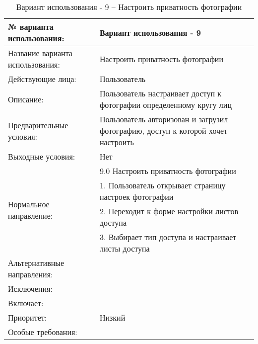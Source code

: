 \begin{table}[H]
  \caption{\onehalfspacing Вариант использования - 9 – Настроить приватность фотографии}\label{use-case-9-table}
  \begin{tabular}{|p{6cm}|p{10cm}|}
  \hline № варианта использования: & Вариант использования - 9 \\
  \hline Название варианта использования: & Настроить приватность фотографии \\
  \hline Действующие лица: & Пользователь \\
  \hline Описание: & Пользователь настраивает доступ к фотографии определенному кругу лиц \\
  \hline Предварительные условия: & Пользователь авторизован и загрузил фотографию, доступ к которой хочет настроить \\
  \hline Выходные условия: & Нет \\
  \hline \multirow{4}{*}{Нормальное направление:} & 9.0 Настроить приватность фотографии \\
  \cline{2-2} & 1. Пользователь открывает страницу настроек фотографии \\
  \cline{2-2} & 2. Переходит к форме настройки листов доступа \\
  \cline{2-2} & 3. Выбирает тип доступа и настраивает листы доступа \\
  \hline Альтернативные направления: &  \\
  \hline Исключения: &  \\
  \hline Включает: &  \\
  \hline Приоритет: & Низкий \\
  \hline Особые требования: &  \\
  \hline 
  \end{tabular}
\end{table}

